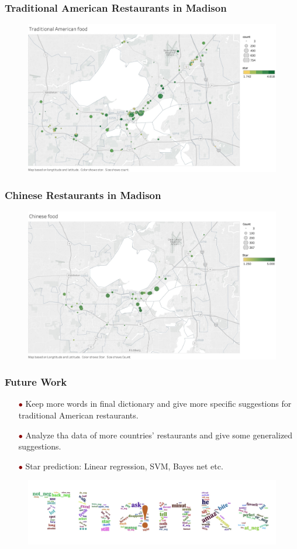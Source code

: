 \documentclass[notheorems, aspectratio=54]{beamer}
\renewcommand\textbullet{\ensuremath{\bullet}}
\begin{document}
\begin{frame}
\frametitle{Traditional American Restaurants in Madison}
\begin{figure}[H]
	\centering
	\includegraphics[width=4.6in]{american.jpg}
\end{figure}
\end{frame}

\begin{frame}
\frametitle{Chinese Restaurants in Madison}
\begin{figure}[H]
	\centering
	\includegraphics[width=4.6in]{chinese.jpg}
\end{figure}
\end{frame}

\begin{frame}
\frametitle{Future Work}
\begin{itemize}
	\item[\textcolor{darkred}{\textbullet}] Keep more words in final dictionary and give more specific suggestions for traditional American restaurants.
		\vspace{2ex}
	\item[\textcolor{darkred}{\textbullet}] Analyze tha data of more countries' restaurants and give some generalized suggestions.
		\vspace{2ex}
	\item[\textcolor{darkred}{\textbullet}] Star prediction: Linear regression, SVM, Bayes net etc.
	
\end{itemize}

\end{frame}

\begin{frame}
\begin{figure}[H]
	\centering
	\includegraphics[width=4.6in]{thanks.jpg}
\end{figure}
\end{frame}
\end{document}
